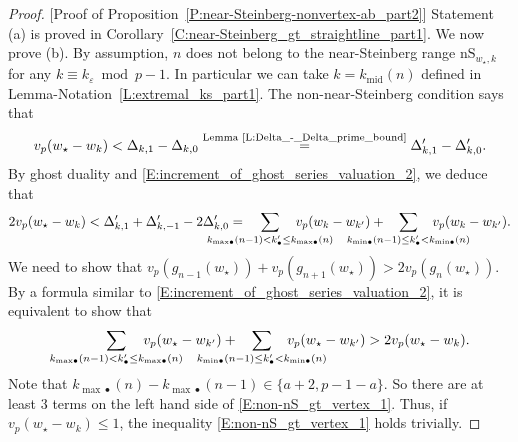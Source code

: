 \begin{proof}
    [Proof of Proposition~\ref{P:near-Steinberg-nonvertex-ab_part2}]
    Statement (a) is proved in Corollary~\ref{C:near-Steinberg_gt_straightline_part1}.
    We now prove (b). By assumption, $n$ does not belong to the near-Steinberg range ${\mathrm{nS}}_{w_\star,k}$ for any $k\equiv k_\varepsilon \bmod p-1$. In particular we can take $k=k_{{\mathrm{mid}}}(n)$ defined in Lemma-Notation~\ref{L:extremal_ks_part1}. The non-near-Steinberg condition says that
    $$v_p(w_\star - w_k) < \Delta_{k, 1} - \Delta_{k, 0} \stackrel{\textrm{Lemma~\ref{L:Delta_-_Delta_prime_bound}}}= \Delta'_{k,1}-\Delta'_{k,0}.
    $$
    By ghost duality and \eqref{E:increment_of_ghost_series_valuation_2}, we deduce that
    \begin{equation}
    \label{E:vp_wbullet_-_wk_lt_Delta_-Delta_explained}
    2v_p(w_\star - w_k) < \Delta'_{k, 1} + \Delta'_{k, -1} - 2\Delta'_{k, 0} =\hspace{-30pt}\sum_{
    k_{{\max}\bullet}(n-1) < k'_\bullet \leq k_{{\max}\bullet}(n)}
    \hspace{-30pt} v_p(w_k - w_{k'})
    +\hspace{-30pt}
    \sum_{
    k_{{\min}\bullet}(n-1) \leq k'_\bullet < k_{{\min}\bullet}(n)}
    \hspace{-30pt}v_p(w_k - w_{k'}).
    \end{equation}
    We need to show that
    $v_p(g_{n-1}(w_\star)) + v_p(g_{n+1}(w_\star)) > 2v_p(g_n(w_\star))$. By a formula similar to \eqref{E:increment_of_ghost_series_valuation_2}, it is equivalent to show that
    \begin{equation}
    \label{E:non-nS_gt_vertex_1}
    \sum_{
    k_{{\max}\bullet}(n-1) < k'_\bullet \leq k_{{\max}\bullet}(n)}
    \hspace{-30pt} v_p(w_\star - w_{k'})
    +\hspace{-30pt}
    \sum_{
    k_{{\min}\bullet}(n-1) \leq k'_\bullet < k_{{\min}\bullet}(n)}
    \hspace{-30pt}v_p(w_\star - w_{k'})
    >
    2 v_p(w_\star - w_{k}).
    \end{equation}
    Note that $k_{{\max}\bullet}(n) - k_{{\max}\bullet}(n-1)\in \{a+2,p-1-a\}$. So there are at least $3$ terms on the left hand side of \eqref{E:non-nS_gt_vertex_1}. Thus, if $v_p(w_\star - w_k)\leq 1$, the inequality \eqref{E:non-nS_gt_vertex_1} holds trivially.

\end{proof}
